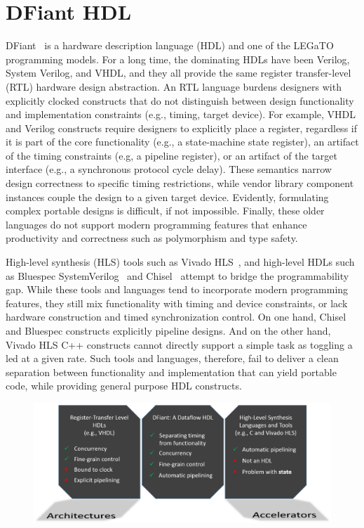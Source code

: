 \section{DFiant HDL}
DFiant~\cite{Port2017} is a hardware description language (HDL) and one of the LEGaTO programming models. For a long time, the dominating HDLs have been Verilog, System Verilog, and VHDL, and they all provide the same register transfer-level (RTL) hardware design abstraction. An RTL language burdens designers with explicitly clocked constructs that do not distinguish between design functionality and implementation constraints (e.g., timing, target device).
For example, VHDL and Verilog constructs require designers to explicitly place a register, regardless if it is part of the core functionality (e.g., a state-machine state register), an artifact of the timing constraints (e.g, a pipeline register), or an artifact of the target interface (e.g., a synchronous protocol cycle delay). These semantics narrow design correctness to specific timing restrictions, while vendor library component instances couple the design to a given target device. Evidently, formulating complex portable designs is difficult, if not impossible. Finally, these older languages do not support modern programming features that enhance productivity and correctness such as polymorphism and type safety.

High-level synthesis (HLS) tools such as Vivado HLS~\cite{Vivado2012}, and high-level HDLs such as Bluespec SystemVerilog~\cite{nikhil2004bluespec} and Chisel~\cite{Bachrach2012} attempt to bridge the programmability gap.
While these tools and languages tend to incorporate modern programming features, they still mix functionality with timing and device constraints, or lack hardware construction and timed synchronization control. On one hand, Chisel and Bluespec constructs explicitly pipeline designs. And on the other hand, Vivado HLS C++ constructs cannot directly support a simple task as toggling a led at a given rate.
Such tools and languages, therefore, fail to deliver a clean separation between functionality and implementation that can yield portable code, while providing general purpose HDL constructs. 

\begin{figure}[h]

\centering

\includegraphics[scale=0.2]{graphics/dfiant_prog_gaps.png} 


\label{fig:prog_gaps}

\end{figure}

